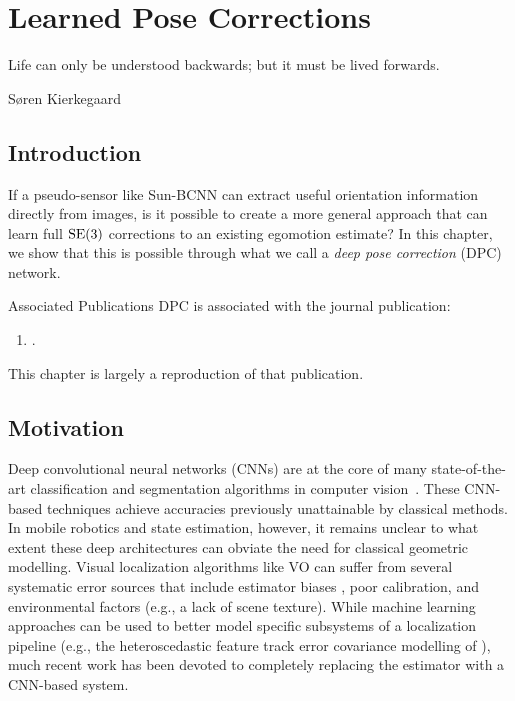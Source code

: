 \chapter{Learned Pose Corrections}
\label{ch:dpc}
\epigraph{Life can only be understood backwards; but it must be lived forwards.}{Søren Kierkegaard}

\section{Introduction}

If a pseudo-sensor like Sun-BCNN can extract useful orientation information directly from images, is it possible to create a more general approach that can learn full $\mathrm{SE}(3)$ corrections to an existing egomotion estimate? In this chapter, we show that this is possible through what we call a \textit{deep pose correction} (DPC) network. 

\begin{remark}{Associated Publications}
DPC is associated with the journal publication:
\begin{enumerate}
\item {}.
\end{enumerate}
This chapter is largely a reproduction of that publication.
\end{remark}







\section{Motivation}
Deep convolutional neural networks (CNNs) are at the core of many state-of-the-art classification and segmentation algorithms in computer vision~\citep{LeCun2015-qf}. 
These CNN-based techniques achieve accuracies previously
unattainable by classical methods. In mobile robotics and state estimation, however, it remains unclear to what extent these deep architectures can obviate the need for classical geometric modelling. 
Visual localization algorithms like VO can suffer from several systematic error sources
that include estimator biases \citep{Peretroukhin2014-db}, poor calibration, and environmental factors (e.g., a lack of scene texture). While machine learning approaches can be used to better model specific subsystems of a localization pipeline (e.g., the heteroscedastic feature track error covariance modelling of \cite{Peretroukhin2016-om, 2015_Peretroukhin_PROBE}), much recent work \citep{Costante2016-hb, Clark2017, Kendall2015-ew, Melekhov2017-dl, Oliveira2017-lt} has been devoted to completely replacing the estimator with a CNN-based system.

